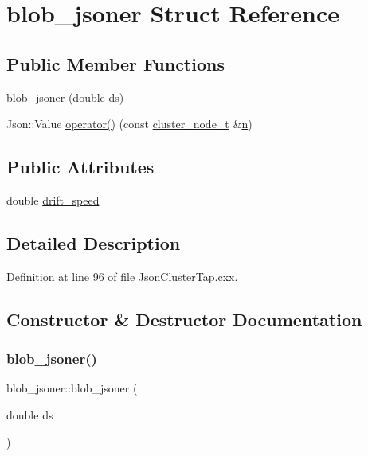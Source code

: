 \hypertarget{structblob__jsoner}{}\section{blob\+\_\+jsoner Struct Reference}
\label{structblob__jsoner}
\subsection*{Public Member Functions}
\begin{DoxyCompactItemize}
\item 
\hyperlink{structblob__jsoner_a0ed0cdb7610be02c193f9c55bb50b982}{blob\+\_\+jsoner} (double ds)
\item 
Json\+::\+Value \hyperlink{structblob__jsoner_a29d902d01e4b6ee0fe321919b32fcc5d}{operator()} (const \hyperlink{struct_wire_cell_1_1cluster__node__t}{cluster\+\_\+node\+\_\+t} \&\hyperlink{format_8h_a9ab7e5832cef391eb8b1505a601fb215}{n})
\end{DoxyCompactItemize}
\subsection*{Public Attributes}
\begin{DoxyCompactItemize}
\item 
double \hyperlink{structblob__jsoner_a1847ed6d883a3b917ce7b3288104e15a}{drift\+\_\+speed}
\end{DoxyCompactItemize}


\subsection{Detailed Description}


Definition at line 96 of file Json\+Cluster\+Tap.\+cxx.



\subsection{Constructor \& Destructor Documentation}
\mbox{\label{structblob__jsoner_a0ed0cdb7610be02c193f9c55bb50b982}} 
\subsubsection{\texorpdfstring{blob\+\_\+jsoner()}{blob\_jsoner()}}
{\footnotesize\ttfamily blob\+\_\+jsoner\+::blob\+\_\+jsoner (\begin{DoxyParamCaption}\item[{double}]{ds }\end{DoxyParamCaption})\hspace{0.3cm}{\ttfamily [inline]}}



